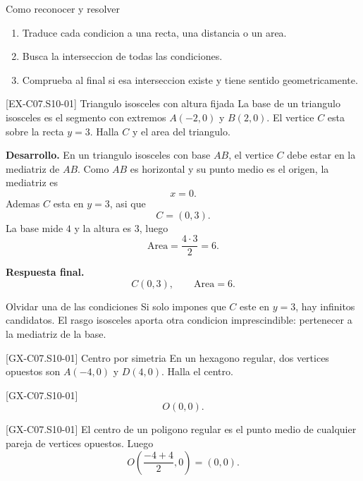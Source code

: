\begin{methodbox}{Como reconocer y resolver}
\begin{enumerate}
  \item Traduce cada condicion a una recta, una distancia o un area.
  \item Busca la interseccion de todas las condiciones.
  \item Comprueba al final si esa interseccion existe y tiene sentido geometricamente.
\end{enumerate}
\end{methodbox}

\begin{solvedexample}{[EX-C07.S10-01] Triangulo isosceles con altura fijada}
La base de un triangulo isosceles es el segmento con extremos \(A(-2,0)\) y \(B(2,0)\). El
vertice \(C\) esta sobre la recta \(y=3\). Halla \(C\) y el area del triangulo.

\textbf{Desarrollo.} En un triangulo isosceles con base \(AB\), el vertice \(C\) debe estar en
la mediatriz de \(AB\). Como \(AB\) es horizontal y su punto medio es el origen, la mediatriz es
\[
x=0.
\]
Ademas \(C\) esta en \(y=3\), asi que
\[
C=(0,3).
\]
La base mide \(4\) y la altura es \(3\), luego
\[
\text{Area}=\frac{4\cdot 3}{2}=6.
\]

\textbf{Respuesta final.}
\[
C(0,3),
\qquad
\text{Area}=6.
\]
\end{solvedexample}

\begin{commonerror}{Olvidar una de las condiciones}
Si solo impones que \(C\) este en \(y=3\), hay infinitos candidatos. El rasgo isosceles aporta
otra condicion imprescindible: pertenecer a la mediatriz de la base.
\end{commonerror}

\begin{guidedexercise}{[GX-C07.S10-01] Centro por simetria}
En un hexagono regular, dos vertices opuestos son \(A(-4,0)\) y \(D(4,0)\). Halla el centro.
\end{guidedexercise}

\begin{shortanswer}{[GX-C07.S10-01]}
\[
O(0,0).
\]
\end{shortanswer}

\begin{fullsolution}{[GX-C07.S10-01]}
El centro de un poligono regular es el punto medio de cualquier pareja de vertices opuestos.
Luego
\[
O\left(\frac{-4+4}{2},0\right)=(0,0).
\]
\end{fullsolution}

